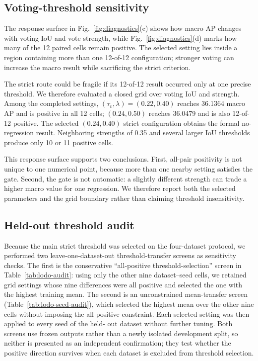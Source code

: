 \documentclass[preprint,12pt,times]{elsarticle}
\newcommand{\figref}[1]{\textcolor{floatreviewblue}{Fig.~\ref{#1}}}
\newcommand{\figref}[1]{Fig.~\ref{#1}}
\begin{document}
\subsection{Voting-threshold sensitivity}

The response surface in \figref{fig:diagnostics}(c) shows how macro AP changes
with voting IoU and vote strength, while \figref{fig:diagnostics}(d) marks how
many of the 12 paired cells remain positive. The selected setting lies inside
a region containing more than one 12-of-12 configuration; stronger voting can
increase the macro result while sacrificing the strict criterion.

The strict route could be fragile if its 12-of-12 result occurred only at one
precise threshold. We therefore evaluated a closed grid over voting IoU and
strength. Among the completed settings, $(\tau_v,\lambda)=(0.22,0.40)$ reaches
36.1364 macro AP and is positive in all 12 cells; $(0.24,0.50)$ reaches
36.0479 and is also 12-of-12 positive. The selected $(0.24,0.40)$ strict
configuration obtains the formal no-regression result. Neighboring
strengths of 0.35 and several larger IoU thresholds produce only 10 or 11
positive cells.

This response surface supports two conclusions. First, all-pair positivity is
not unique to one numerical point, because more than one nearby setting
satisfies the gate. Second, the gate is not automatic: a slightly different
strength can trade a higher macro value for one regression. We therefore
report both the selected parameters and the grid boundary rather than claiming
threshold insensitivity.

\subsection{Held-out threshold audit}

Because the main strict threshold was selected on the four-dataset protocol,
we performed two leave-one-dataset-out threshold-transfer screens as
sensitivity checks. The first is the conservative ``all-positive
threshold-selection'' screen
in Table~\ref{tab:lodo-audit}: using only the other nine dataset--seed cells, we
retained grid settings whose nine differences were all positive and selected
the one with the highest training mean. The second is an unconstrained
mean-transfer screen (Table~\ref{tab:lodo-seed-audit}), which selected the
highest mean over the other nine cells without imposing the all-positive
constraint. Each selected setting was then applied to every seed of the held-
out dataset without further tuning. Both screens use frozen outputs rather
than a newly isolated development split, so neither is presented as an
independent confirmation; they test whether the positive direction survives
when each dataset is excluded from threshold selection.
\end{document}
